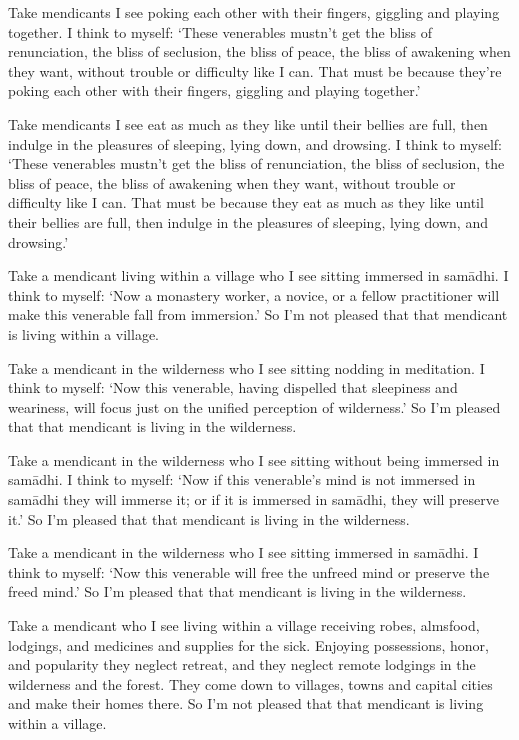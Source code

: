 \documentclass[12pt,openany]{book}%
\begin{document}
Take mendicants I see poking each other with their fingers, giggling and playing together. I think to myself: ‘These venerables mustn’t get the bliss of renunciation, the bliss of seclusion, the bliss of peace, the bliss of awakening when they want, without trouble or difficulty like I can. That must be because they’re poking each other with their fingers, giggling and playing together.’ 

Take mendicants I see eat as much as they like until their bellies are full, then indulge in the pleasures of sleeping, lying down, and drowsing. I think to myself: ‘These venerables mustn’t get the bliss of renunciation, the bliss of seclusion, the bliss of peace, the bliss of awakening when they want, without trouble or difficulty like I can. That must be because they eat as much as they like until their bellies are full, then indulge in the pleasures of sleeping, lying down, and drowsing.’ 

Take a mendicant living within a village who I see sitting immersed in \textsanskrit{samādhi}. I think to myself: ‘Now a monastery worker, a novice, or a fellow practitioner will make this venerable fall from immersion.’ So I’m not pleased that that mendicant is living within a village. 

Take a mendicant in the wilderness who I see sitting nodding in meditation. I think to myself: ‘Now this venerable, having dispelled that sleepiness and weariness, will focus just on the unified perception of wilderness.’ So I’m pleased that that mendicant is living in the wilderness. 

Take a mendicant in the wilderness who I see sitting without being immersed in \textsanskrit{samādhi}. I think to myself: ‘Now if this venerable’s mind is not immersed in \textsanskrit{samādhi} they will immerse it; or if it is immersed in \textsanskrit{samādhi}, they will preserve it.’ So I’m pleased that that mendicant is living in the wilderness. 

Take a mendicant in the wilderness who I see sitting immersed in \textsanskrit{samādhi}. I think to myself: ‘Now this venerable will free the unfreed mind or preserve the freed mind.’ So I’m pleased that that mendicant is living in the wilderness. 

Take a mendicant who I see living within a village receiving robes, almsfood, lodgings, and medicines and supplies for the sick. Enjoying possessions, honor, and popularity they neglect retreat, and they neglect remote lodgings in the wilderness and the forest. They come down to villages, towns and capital cities and make their homes there. So I’m not pleased that that mendicant is living within a village. 
\end{document}
